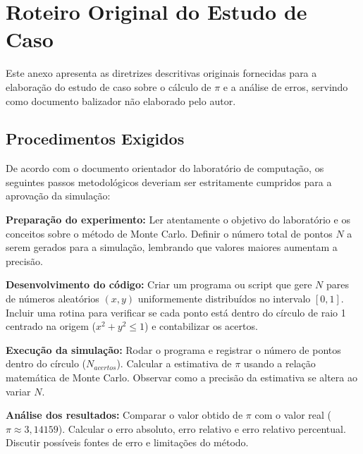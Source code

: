 \chapter{Roteiro Original do Estudo de Caso}
\label{ane:roteiro_original}

Este anexo apresenta as diretrizes descritivas originais fornecidas para a elaboração do estudo de caso sobre o cálculo de \texorpdfstring{$\pi$}{pi} e a análise de erros, servindo como documento balizador não elaborado pelo autor.

\section*{Procedimentos Exigidos}

De acordo com o documento orientador do laboratório de computação, os seguintes passos metodológicos deveriam ser estritamente cumpridos para a aprovação da simulação:

\begin{alineas}
    \item \textbf{Preparação do experimento:} Ler atentamente o objetivo do laboratório e os conceitos sobre o método de Monte Carlo. Definir o número total de pontos $N$ a serem gerados para a simulação, lembrando que valores maiores aumentam a precisão.
    
    \item \textbf{Desenvolvimento do código:} Criar um programa ou script que gere $N$ pares de números aleatórios $(x, y)$ uniformemente distribuídos no intervalo $[0,1]$. Incluir uma rotina para verificar se cada ponto está dentro do círculo de raio 1 centrado na origem ($x^2+y^2 \leq 1$) e contabilizar os acertos.
    
    \item \textbf{Execução da simulação:} Rodar o programa e registrar o número de pontos dentro do círculo ($N_{acertos}$). Calcular a estimativa de \texorpdfstring{$\pi$}{pi} usando a relação matemática de Monte Carlo. Observar como a precisão da estimativa se altera ao variar $N$.
    
    \item \textbf{Análise dos resultados:} Comparar o valor obtido de \texorpdfstring{$\pi$}{pi} com o valor real ($\pi \approx 3,14159$). Calcular o erro absoluto, erro relativo e erro relativo percentual. Discutir possíveis fontes de erro e limitações do método.
\end{alineas}